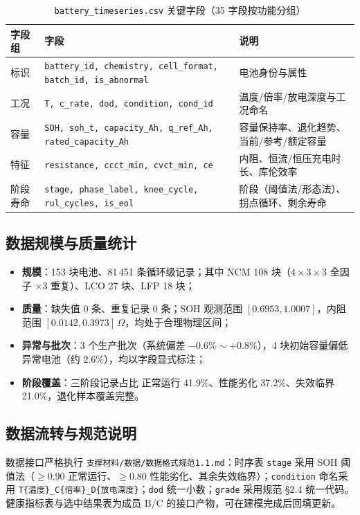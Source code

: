 \documentclass[withoutpreface]{cumcmthesis}
\begin{document}
\begin{appendices}
\begin{table}[H]
\centering
\small
\begin{tabularx}{\textwidth}{LLL}
\toprule
字段组 & 字段 & 说明 \\
\midrule
标识 & \texttt{battery\_id, chemistry, cell\_format, batch\_id, is\_abnormal} & 电池身份与属性 \\
工况 & \texttt{T, c\_rate, dod, condition, cond\_id} & 温度/倍率/放电深度与工况命名 \\
容量 & \texttt{SOH, soh\_t, capacity\_Ah, q\_ref\_Ah, rated\_capacity\_Ah} & 容量保持率、退化趋势、当前/参考/额定容量 \\
特征 & \texttt{resistance, ccct\_min, cvct\_min, ce} & 内阻、恒流/恒压充电时长、库伦效率 \\
阶段寿命 & \texttt{stage, phase\_label, knee\_cycle, rul\_cycles, is\_eol} & 阶段（阈值法/形态法）、拐点循环、剩余寿命 \\
\bottomrule
\end{tabularx}
\caption{\texttt{battery\_timeseries.csv} 关键字段（35 字段按功能分组）}
\end{table}

\subsection{数据规模与质量统计}
\begin{sloppypar}
\begin{itemize}
\item \textbf{规模}：153 块电池、81\,451 条循环级记录；其中 NCM 108 块（$4\times3\times3$ 全因子 $\times3$ 重复）、LCO 27 块、LFP 18 块；
\item \textbf{质量}：缺失值 0 条、重复记录 0 条；SOH 观测范围 $[0.6953,1.0007]$，内阻范围 $[0.0142,0.3973]$\,$\Omega$，均处于合理物理区间；
\item \textbf{异常与批次}：3 个生产批次（系统偏差 $-0.6\%\sim+0.8\%$），4 块初始容量偏低异常电池（约 2.6\%），均以字段显式标注；
\item \textbf{阶段覆盖}：三阶段记录占比 正常运行 41.9\%、性能劣化 37.2\%、失效临界 21.0\%，退化样本覆盖完整。
\end{itemize}
\end{sloppypar}

\subsection{数据流转与规范说明}
数据接口严格执行 \texttt{支撑材料/数据/数据格式规范1.1.md}：时序表 \texttt{stage} 采用 SOH 阈值法（$\ge0.90$ 正常运行、$\ge0.80$ 性能劣化、其余失效临界）；\texttt{condition} 命名采用 \texttt{T\{温度\}\_C\{倍率\}\_D\{放电深度\}}；\texttt{dod} 统一小数；\texttt{grade} 采用规范 §2.4 统一代码。健康指标表与选中结果表为成员 B/C 的接口产物，可在建模完成后回填更新。


\end{appendices}
\end{document}
